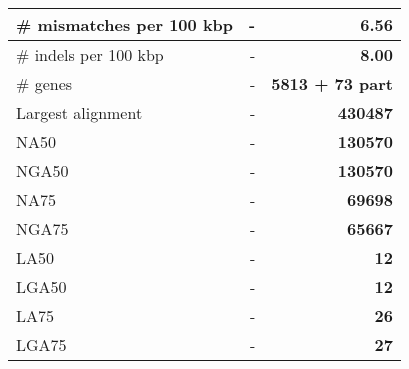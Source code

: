 \documentclass[12pt,a4paper]{article}
\begin{document}
\begin{table}[ht]
\begin{center}
\begin{tabular}{|l*{2}{|r}|}
\# mismatches per 100 kbp & - & {\bf 6.56} \\ \hline
\# indels per 100 kbp & - & {\bf 8.00} \\ \hline
\# genes & - & {\bf 5813 + 73 part} \\ \hline
Largest alignment & - & {\bf 430487} \\ \hline
NA50 & - & {\bf 130570} \\ \hline
NGA50 & - & {\bf 130570} \\ \hline
NA75 & - & {\bf 69698} \\ \hline
NGA75 & - & {\bf 65667} \\ \hline
LA50 & - & {\bf 12} \\ \hline
LGA50 & - & {\bf 12} \\ \hline
LA75 & - & {\bf 26} \\ \hline
LGA75 & - & {\bf 27} \\ \hline
\end{tabular}
\end{center}
\end{table}
\end{document}
